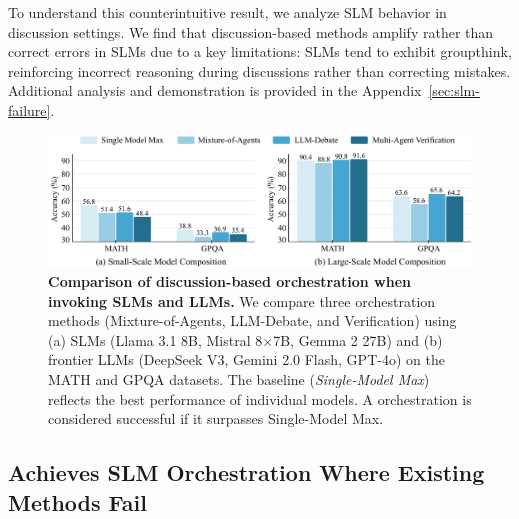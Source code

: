 To understand this counterintuitive result, we analyze SLM behavior in discussion settings. We find that discussion-based methods amplify rather than correct errors in SLMs due to a key limitations: SLMs tend to exhibit groupthink, reinforcing incorrect reasoning during discussions rather than correcting mistakes. Additional analysis and demonstration is provided in the Appendix~\ref{sec:slm-failure}.



\begin{figure}[htbp]
  \centering
  \includegraphics[width=0.9\linewidth]{Figures/Small-large-acc-light-blue_v2.pdf}
  \vspace{-8pt}
  \caption{\small \textbf{Comparison of discussion-based orchestration when invoking SLMs and LLMs.} We compare three orchestration methods (Mixture-of-Agents, LLM-Debate, and Verification) using (a) SLMs (Llama 3.1 8B, Mistral 8$\times$7B, Gemma 2 27B) and (b) frontier LLMs (DeepSeek V3, Gemini 2.0 Flash, GPT-4o) on the \textsc{MATH} and \textsc{GPQA} datasets. The baseline (\textit{Single-Model Max}) reflects the best performance of individual models. A orchestration is considered successful if it surpasses Single-Model Max.}\label{fig:small-large-accuracy}
  \vspace{-10pt}
\end{figure}



\vspace{3pt}
\subsection{\NAME{} Achieves SLM Orchestration Where Existing Methods Fail}
\vspace{3pt}
\label{sub:vanilla}

